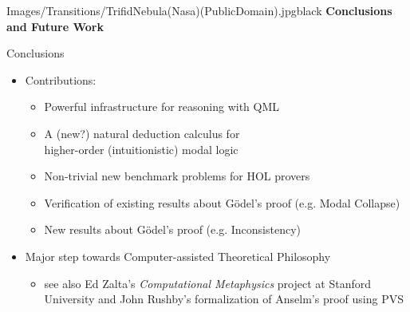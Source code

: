 
\begin{transitionframe}{Images/Transitions/TrifidNebula(Nasa)(PublicDomain).jpg}{black}
\textbf{Conclusions and Future Work}
\end{transitionframe}






\begin{frame}{Conclusions} \large

\begin{itemize}
\item Contributions: \\[.5em]
\begin{itemize}
\item Powerful infrastructure for reasoning with QML
\item A (new?) natural deduction calculus for \\ higher-order (intuitionistic) modal logic
\item Non-trivial new benchmark problems for HOL provers
\item Verification of existing results about G\"odel's proof (e.g. Modal Collapse)
\item New results about G\"odel's proof (e.g. Inconsistency)
\end{itemize}


\item Major step towards \alert{Computer-assisted Theoretical Philosophy}
 \begin{itemize}
  \item see also Ed Zalta's \emph{Computational Metaphysics} project at Stanford University and John Rushby's formalization of Anselm's proof using PVS
  \end{itemize}
\end{itemize}
\end{frame}

